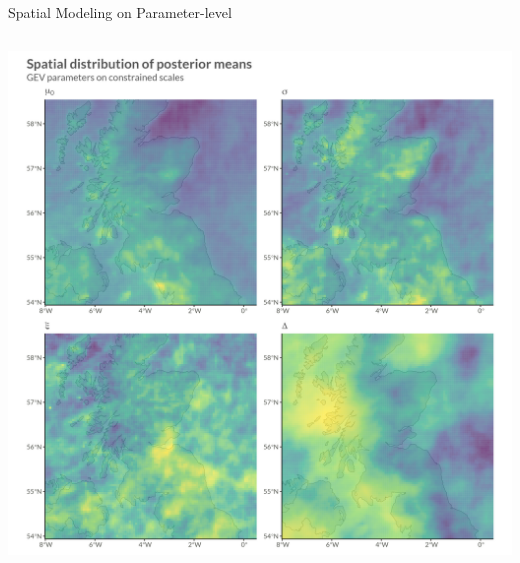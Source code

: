 \documentclass[
  ignorenonframetext,
]{beamer}
\begin{document}
\begin{frame}{Spatial Modeling on Parameter-level}
\begin{columns}[T]
\begin{column}{0.5\textwidth}
\includegraphics{images/facet_constrained.png}
\end{column}
\end{columns}
\end{frame}
\end{document}
